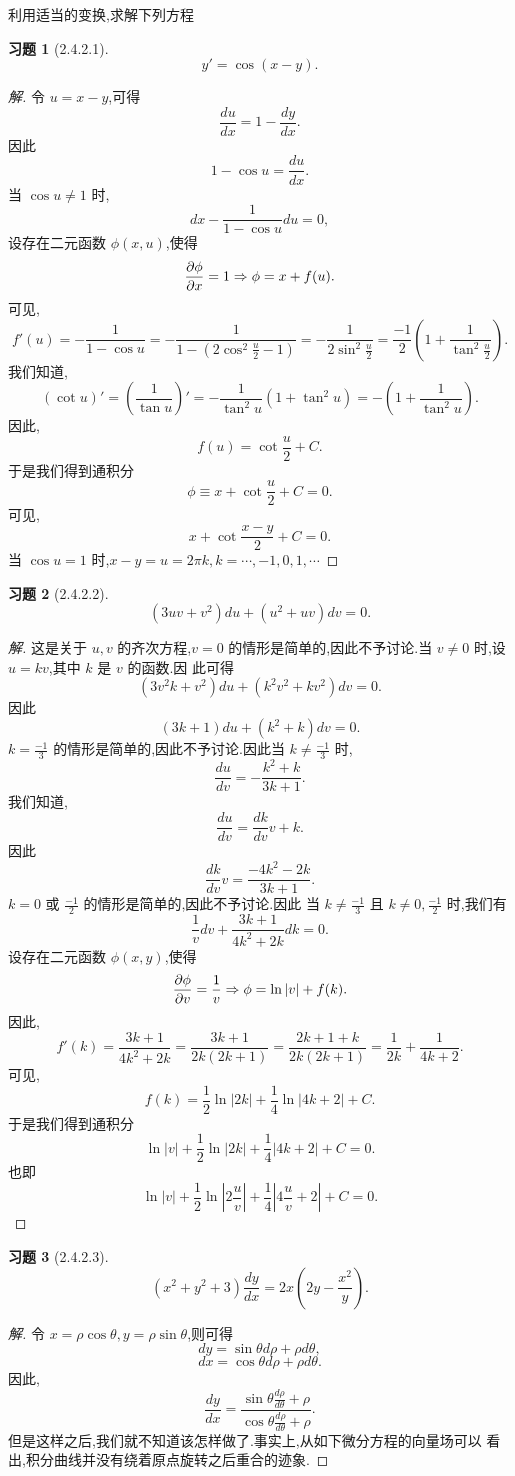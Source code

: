 \documentclass[a4paper, 12pt]{article} %
\newtheorem*{cdtheorem}{习题}
\newenvironment{exercise}
{\bigskip\begin{mdframed}[backgroundcolor=gray!40,rightline=false,leftline=false,topline=false,bottomline=false]\begin{cdtheorem}}
    {\end{cdtheorem}\end{mdframed}\bigskip}
\begin{document}
\begin{CJK}{UTF8}{gkai}
  利用适当的变换,求解下列方程
  \begin{exercise}[2.4.2.1]
$$
y'=\cos (x-y).
$$    
  \end{exercise}
  \begin{proof}[解]
    令 $u=x-y$,可得
$$
\frac{du}{dx}=1-\frac{dy}{dx}.
$$
因此
$$
1-\cos u=\frac{du}{dx}.
$$
当 $\cos u\neq 1$ 时,
$$
dx-\frac{1}{1-\cos u}du=0,
$$
设存在二元函数 $\phi(x,u)$,使得
$$
\frac{\partial\phi}{\partial x}=1\Rightarrow \phi=x+f(u).
$$
可见,
$$
f'(u)=-\frac{1}{1-\cos u}=-\frac{1}{1-(2\cos^2
  \frac{u}{2}-1)}=-\frac{1}{2\sin^2
  \frac{u}{2}}=\frac{-1}{2}(1+\frac{1}{\tan^2 \frac{u}{2}}).
$$
我们知道,
$$
(\cot u)'=(\frac{1}{\tan u})'=-\frac{1}{\tan^2u}(1+\tan^2u)=-(1+\frac{1}{\tan^2u}).
$$
因此,
$$
f(u)=\cot \frac{u}{2}+C.
$$
于是我们得到通积分
$$
\phi\equiv x+\cot \frac{u}{2}+C=0.
$$
可见,
$$
x+\cot \frac{x-y}{2}+C=0.
$$
当 $\cos u=1$ 时,$x-y=u=2\pi k,k=\cdots,-1,0,1,\cdots$
  \end{proof}
  \begin{exercise}[2.4.2.2]
$$
(3uv+v^2)du+(u^2+uv)dv=0.
$$
  \end{exercise}
  \begin{proof}[解]
    这是关于 $u,v$ 的齐次方程,$v=0$ 的情形是简单的,因此不予讨论.当 $v\neq 0$ 时,设 $u=kv$,其中 $k$ 是 $v$ 的函数.因
    此可得
$$
(3v^2k+v^2)du+(k^2v^2+kv^2)dv=0.
$$
因此
$$
(3k+1)du+(k^2+k)dv=0.
$$
$k=\frac{-1}{3}$ 的情形是简单的,因此不予讨论.因此当 $k\neq \frac{-1}{3}$ 时,
$$
\frac{du}{dv}=-\frac{k^2+k}{3k+1}.
$$
我们知道,
$$
\frac{du}{dv}=\frac{dk}{dv}v+k.
$$
因此
$$
\frac{dk}{dv}v=\frac{-4k^2-2k}{3k+1}.
$$
$k=0$ 或 $\frac{-1}{2}$ 的情形是简单的,因此不予讨论.因此 当 $k\neq \frac{-1}{3}$ 且 $k\neq 0,\frac{-1}{2}$ 时,我们有
$$
\frac{1}{v}dv+\frac{3k+1}{4k^2+2k}dk=0.
$$
设存在二元函数 $\phi(x,y)$,使得
$$
\frac{\partial\phi}{\partial v}=\frac{1}{v}\Rightarrow \phi=\ln |v|+f(k).
$$
因此,
$$
f'(k)=\frac{3k+1}{4k^2+2k}=\frac{3k+1}{2k(2k+1)}=\frac{2k+1+k}{2k(2k+1)}=\frac{1}{2k}+\frac{1}{4k+2}.
$$
可见,
$$
f(k)=\frac{1}{2}\ln |2k|+\frac{1}{4}\ln |4k+2|+C.
$$
于是我们得到通积分
$$
\ln |v|+\frac{1}{2}\ln |2k|+\frac{1}{4}|4k+2|+C=0.
$$
也即
$$
\ln |v|+\frac{1}{2}\ln |2 \frac{u}{v}|+\frac{1}{4}|4 \frac{u}{v}+2|+C=0.
$$  \end{proof}
\begin{exercise}[2.4.2.3]
$$
(x^2+y^2+3)\frac{dy}{dx}=2x(2y-\frac{x^2}{y}).
$$
\end{exercise}
\begin{proof}[解]
令 $x=\rho\cos\theta,y=\rho\sin\theta$,则可得
$$
dy=\sin\theta d\rho+\rho d\theta,
$$
$$
dx=\cos\theta d\rho+\rho d\theta.
$$
因此,
$$
\frac{dy}{dx}=\frac{\sin\theta \frac{d\rho}{d\theta}+\rho}{\cos\theta \frac{d\rho}{d\theta}+\rho}.
$$
但是这样之后,我们就不知道该怎样做了.事实上,从如下微分方程的向量场可以
看出,积分曲线并没有绕着原点旋转之后重合的迹象.


\end{proof}
\end{CJK}
\end{document}
